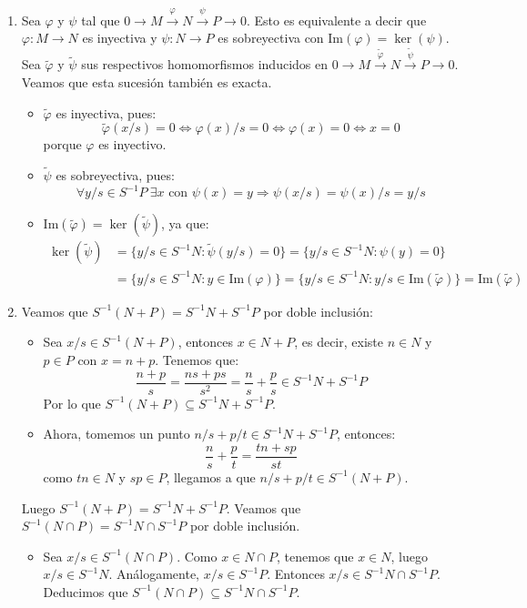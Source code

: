 \documentclass[twoside]{article}
\begin{document}
\begin{solucion}\mbox{}
\begin{enumerate}
	\item Sea $φ$ y $ψ$ tal que $0 \to M \xrightarrow{φ} N \xrightarrow{ψ} P \to 0$. Esto es equivalente a decir que $φ : M \to N$ es inyectiva y $ψ : N \to P$ es sobreyectiva con $\text{Im}(φ) = \ker(ψ)$. Sea $\tilde{φ}$ y $\tilde{ψ}$ sus respectivos homomorfismos inducidos en $0 \to M \xrightarrow{\tilde{φ}} N \xrightarrow{\tilde{ψ}} P \to 0$. Veamos que esta sucesión también es exacta.
	\begin{itemize}
	\item $\tilde{φ}$ es inyectiva, pues:
	\[ \tilde{φ}(x/s) = 0 \Leftrightarrow φ(x)/s = 0 \Leftrightarrow φ(x) = 0 \Leftrightarrow x = 0 \]
	porque $φ$ es inyectivo.

	\item $\tilde{ψ}$ es sobreyectiva, pues:
	\[ \forall y/s \in S^{-1}P\ \exists x\text{ con }ψ(x)=y \Rightarrow ψ(x/s) = ψ(x)/s = y/s \]

	\item $\text{Im}(\tilde{φ}) = \ker(\tilde{ψ})$, ya que:
	\begin{align*}
		\ker(\tilde{ψ}) & = \{y/s \in S^{-1}N : \tilde{ψ}(y/s) = 0\} = \{y/s \in S^{-1}N : ψ(y) = 0\}\\
		& = \{y/s \in S^{-1}N : y \in \text{Im}(φ)\} = \{y/s \in S^{-1}N : y/s \in \text{Im}(\tilde{φ})\} = \text{Im}(\tilde{φ})
	\end{align*}
\end{itemize}

	\item Veamos que $S^{-1}(N+P) = S^{-1}N + S^{-1}P$ por doble inclusión:
	\begin{itemize}
	\item Sea $x/s \in S^{-1}(N+P)$, entonces $x \in N+P$, es decir, existe $n \in N$ y $p \in P$ con $x=n+p$. Tenemos que:
	\[ \frac{n+p}{s} = \frac{ns+ps}{s^2} = \frac{n}{s}+\frac{p}{s} \in S^{-1}N+S^{-1}P \]
	Por lo que $S^{-1}(N+P) \subseteq S^{-1}N+S^{-1}P$.

	\item Ahora, tomemos un punto $n/s+p/t \in S^{-1}N+S^{-1}P$, entonces:
	\[ \frac{n}{s}+\frac{p}{t} = \frac{tn+sp}{st} \]
	como $tn \in N$ y $sp \in P$, llegamos a que $n/s+p/t \in S^{-1}(N+P)$.
	\end{itemize}
	Luego $S^{-1}(N+P) = S^{-1}N+S^{-1}P$. Veamos que $S^{-1}(N \cap P) = S^{-1}N \cap S^{-1}P$ por doble inclusión.
	\begin{itemize}
		\item Sea $x/s \in S^{-1}(N \cap P)$. Como $x \in N \cap P$, tenemos que $x \in N$, luego $x/s \in S^{-1}N$. Análogamente, $x/s \in S^{-1}P$. Entonces $x/s \in S^{-1}N \cap S^{-1}P$. Deducimos que $S^{-1}(N \cap P) \subseteq S^{-1}N \cap S^{-1}P$.


\end{itemize}
\end{enumerate}
\end{solucion}
\end{document}
